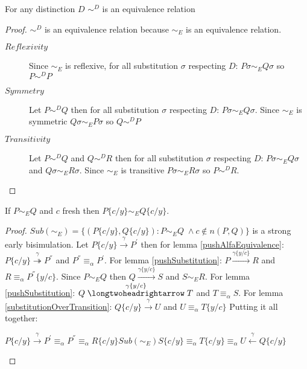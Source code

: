  
\begin{lemma}\label{strongDEquivalenceIsAnEquivalence}
  For any distinction $D$ $\sim^{D}$ is an equivalence relation
  \begin{proof}
    $\sim^{D}$ is an equivalence relation because $\sim_{E}$ is an equivalence relation.
    \begin{description}
      \item[$Reflexivity$]
	Since $\sim_{E}$ is reflexive, for all substitution $\sigma$ respecting $D$: $P\sigma \sim_{E} Q\sigma$ so $P \sim^{D} P$
      \item[$Symmetry$]
	Let $P \sim^{D} Q$ then for all substitution $\sigma$ respecting $D$: $P\sigma \sim_{E} Q\sigma$. Since $\sim_{E}$ is symmetric $Q\sigma \sim_{E} P\sigma$ so $Q \sim^{D} P$
      \item[$Transitivity$]
	Let $P \sim^{D} Q$ and $Q \sim^{D} R$ then for all substitution $\sigma$ respecting $D$: $P\sigma \sim_{E} Q\sigma$ and $Q\sigma \sim_{E} R\sigma$. Since $\sim_{E}$ is transitive $P\sigma \sim_{E} R\sigma$ so $P \sim^{D} R$.
    \end{description}
  \end{proof}
\end{lemma}

\begin{lemma}\label{freshSubstitutionPreservesEarlyBisimulation}
  If $P \sim_{E} Q$ and $c$ fresh then $P\{c/y\} \sim_{E} Q\{c/y\}$.
  \begin{proof}
    $Sub(\sim_{E})=\{(P\{c/y\}, Q\{c/y\}): P\sim_{E}Q\; \wedge c\notin n(P,Q)\}$ is a strong early bisimulation. Let $P\{c/y\} \xrightarrow{\gamma} P^{'}$ then for lemma \ref{pushAlfaEquivalence}: $P\{c/y\} \stackrel{\gamma}{\twoheadrightarrow} P^{''}$ and $P^{''}\equiv_{\alpha}P^{'}$. For lemma \ref{pushSubstitution}: $P \xrightarrow{\gamma \{y/c\}} R$ and $R\equiv_{\alpha}P^{''}\{y/c\}$. Since $P\sim_{E}Q$ then $Q \xrightarrow{\gamma \{y/c\}} S$ and $S\sim_{E} R$. For lemma \ref{pushSubstitution}: $Q \stackrel{\gamma \{y/c\}}{\longtwoheadrightarrow} T$ and $T\equiv_{\alpha}S$. For lemma \ref{substitutionOverTransition}: $Q\{c/y\} \xrightarrow{\gamma} U$ and $U \equiv_{\alpha} T\{y/c\}$ Putting it all together:
    \begin{center}
      $P\{c/y\} \xrightarrow{\gamma} P^{'} \equiv_{\alpha} P^{''} \equiv_{\alpha} R\{c/y\} Sub(\sim_{E}) S\{c/y\} \equiv_{\alpha} T\{c/y\} \equiv_{\alpha} U \stackrel{\gamma}{\leftarrow} Q\{c/y\}$
    \end{center}
  \end{proof}
\end{lemma}


